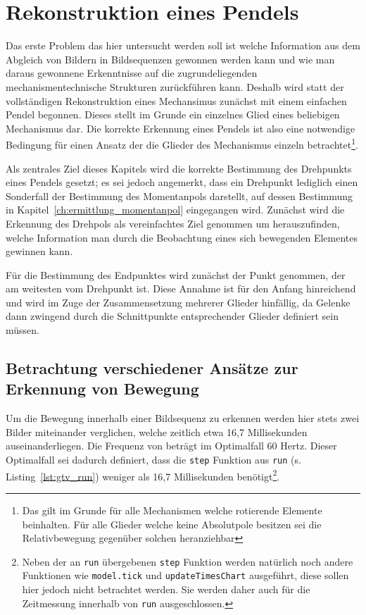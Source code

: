 
\chapter{Rekonstruktion eines Pendels}


Das erste Problem das hier untersucht werden soll ist welche Information aus dem Abgleich von Bildern in Bildsequenzen gewonnen werden kann und wie man daraus gewonnene Erkenntnisse auf die zugrundeliegenden mechanismentechnische Strukturen zurückführen kann.
Deshalb wird statt der vollständigen Rekonstruktion eines Mechansimus zunächst mit einem einfachen Pendel begonnen.
Dieses stellt im Grunde ein einzelnes Glied eines beliebigen Mechanismus dar.
Die korrekte Erkennung eines Pendels ist also eine notwendige Bedingung für einen Ansatz der die Glieder des Mechanismus einzeln betrachtet\footnote{Das gilt im Grunde für alle Mechanismen welche rotierende Elemente beinhalten. Für alle Glieder welche keine Absolutpole besitzen sei die Relativbewegung gegenüber solchen heranziehbar}.

Als zentrales Ziel dieses Kapitels wird die korrekte Bestimmung des Drehpunkts eines Pendels gesetzt; es sei jedoch angemerkt, dass ein Drehpunkt lediglich einen Sonderfall der Bestimmung des Momentanpols darstellt, auf dessen Bestimmung in Kapitel~\ref{ch:ermittlung_momentanpol} eingegangen wird.
Zunächst wird die Erkennung des Drehpols als vereinfachtes Ziel genommen um herauszufinden, welche Information man durch die Beobachtung eines sich bewegenden Elementes gewinnen kann.

Für die Bestimmung des Endpunktes wird zunächst der Punkt genommen, der am weitesten vom Drehpunkt ist.
Diese Annahme ist für den Anfang hinreichend und wird im Zuge der Zusammensetzung mehrerer Glieder hinfällig, da Gelenke dann zwingend durch die Schnittpunkte entsprechender Glieder definiert sein müssen.

\section{Betrachtung verschiedener Ansätze zur Erkennung von Bewegung} \label{ch:erkennung_von_änderungen}

Um die Bewegung innerhalb einer Bildsequenz zu erkennen werden hier stets zwei Bilder miteinander verglichen, welche zeitlich etwa 16,7 Millisekunden auseinanderliegen.
Die Frequenz von  beträgt im Optimalfall 60 Hertz.
Dieser Optimalfall sei dadurch definiert, dass die \lstinline{step} Funktion aus \lstinline{run} (s. Listing~\ref{lst:gtv_run}) weniger als 16,7 Millisekunden benötigt\footnote{Neben der an \lstinline{run} übergebenen \lstinline{step} Funktion werden natürlich noch andere Funktionen wie \lstinline{model.tick} und \lstinline{updateTimesChart} ausgeführt, diese sollen hier jedoch nicht betrachtet werden. Sie werden daher auch für die Zeitmessung innerhalb von \lstinline{run} ausgeschlossen.}.

